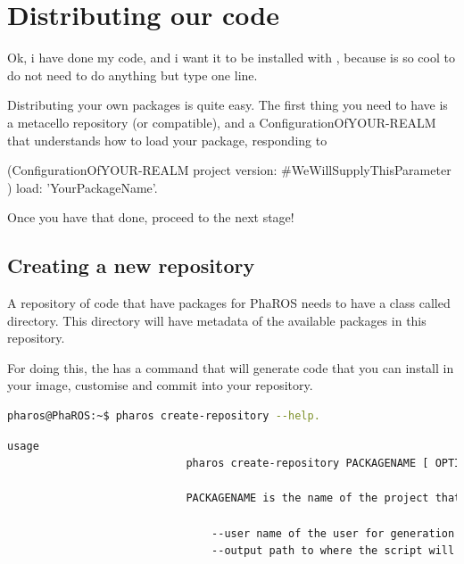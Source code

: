 \documentclass[a4paper,10pt,twoside]{book}
\begin{document}
\fi
\sloppy
\chapter{ Distributing our code } 
\label{code:distribution}
				
					Ok, i have done my code, and i want it to be installed with \installationTool{}, because is so cool to do not need to do anything but type one line.
					
					Distributing your own packages is quite easy. The first thing you need to have is a metacello repository (or compatible), and a ConfigurationOfYOUR-REALM that understands how to load your package, responding to 
					
					(ConfigurationOfYOUR-REALM project version: \#WeWillSupplyThisParameter ) load: 'YourPackageName'. 
					
					Once you have that done, proceed to the next stage! 
					
					\section{Creating a new repository}
					
					A repository of code that have packages for PhaROS needs to have a class called directory. This directory will have metadata of the available packages in this repository. 
					
					For doing this, the \installationTool{} has a command that will generate code that you can install in your image, customise and commit into your repository.
					
					
					
					
					\begin{lstlisting}[language=bash,title={ Repository creation }]
						pharos@PhaROS:~$ pharos create-repository --help.
					\end{lstlisting} 
				
					\begin{lstlisting}[language=bash,title={ Repository creation }]
						usage
							pharos create-repository PACKAGENAME [ OPTIONS ]
	
							PACKAGENAME is the name of the project that this directory will represent. By Example PhaROS.
	
								--user name of the user for generation by default is 'Generated'
								--output path to where the script will be dumped. By default is the standar output.


					\end{lstlisting} 
										
\end{document}
